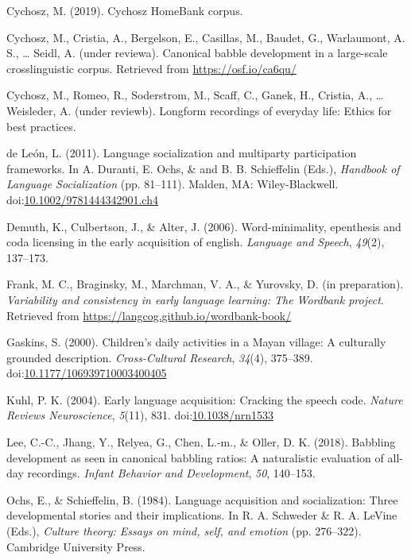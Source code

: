 \documentclass[,man,floatsintext]{apa6}
\begin{document}
\hypertarget{ref-Cychosz-HB}{}
Cychosz, M. (2019). Cychosz HomeBank corpus.

\hypertarget{ref-cychoszURcanonical}{}
Cychosz, M., Cristia, A., Bergelson, E., Casillas, M., Baudet, G.,
Warlaumont, A. S., \ldots{} Seidl, A. (under reviewa). Canonical babble
development in a large-scale crosslinguistic corpus. Retrieved from
\url{https://osf.io/ca6qu/}

\hypertarget{ref-cychoszURlongform}{}
Cychosz, M., Romeo, R., Soderstrom, M., Scaff, C., Ganek, H., Cristia,
A., \ldots{} Weisleder, A. (under reviewb). Longform recordings of
everyday life: Ethics for best practices.

\hypertarget{ref-deleon2011language}{}
de León, L. (2011). Language socialization and multiparty participation
frameworks. In A. Duranti, E. Ochs, \& and B. B. Schieffelin (Eds.),
\emph{Handbook of Language Socialization} (pp. 81--111). Malden, MA:
Wiley-Blackwell.
doi:\href{https://doi.org/10.1002/9781444342901.ch4}{10.1002/9781444342901.ch4}

\hypertarget{ref-demuth2006word}{}
Demuth, K., Culbertson, J., \& Alter, J. (2006). Word-minimality,
epenthesis and coda licensing in the early acquisition of english.
\emph{Language and Speech}, \emph{49}(2), 137--173.

\hypertarget{ref-frankIPvariability}{}
Frank, M. C., Braginsky, M., Marchman, V. A., \& Yurovsky, D. (in
preparation). \emph{Variability and consistency in early language
learning: The Wordbank project}. Retrieved from
\url{https://langcog.github.io/wordbank-book/}

\hypertarget{ref-gaskins2000childrens}{}
Gaskins, S. (2000). Children's daily activities in a Mayan village: A
culturally grounded description. \emph{Cross-Cultural Research},
\emph{34}(4), 375--389.
doi:\href{https://doi.org/10.1177/106939710003400405}{10.1177/106939710003400405}

\hypertarget{ref-kuhl2004early}{}
Kuhl, P. K. (2004). Early language acquisition: Cracking the speech
code. \emph{Nature Reviews Neuroscience}, \emph{5}(11), 831.
doi:\href{https://doi.org/10.1038/nrn1533}{10.1038/nrn1533}

\hypertarget{ref-lee2018babbling}{}
Lee, C.-C., Jhang, Y., Relyea, G., Chen, L.-m., \& Oller, D. K. (2018).
Babbling development as seen in canonical babbling ratios: A
naturalistic evaluation of all-day recordings. \emph{Infant Behavior and
Development}, \emph{50}, 140--153.

\hypertarget{ref-ochs1984language}{}
Ochs, E., \& Schieffelin, B. (1984). Language acquisition and
socialization: Three developmental stories and their implications. In R.
A. Schweder \& R. A. LeVine (Eds.), \emph{Culture theory: Essays on
mind, self, and emotion} (pp. 276--322). Cambridge University Press.
\end{document}
